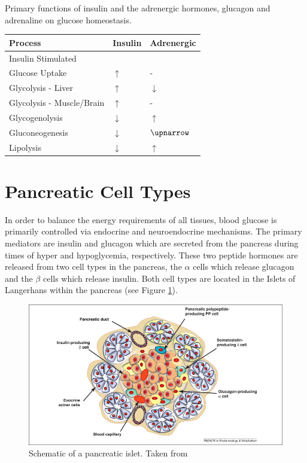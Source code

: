 \documentclass{tufte-handout}
\begin{document}
\begin{margintable}
\caption{Primary functions of insulin and the adrenergic hormones, glucagon and adrenaline on glucose homeostasis.}
\label{tab:endocrine-glucose}
\begin{tabular}{@{}lll@{}}
\textbf{Process }                          & \textbf{Insulin}  & \textbf{Adrenergic}           \\ \midrule
Insulin Stimulated \\Glucose Uptake & $\uparrow$ & -  \\ \midrule
Glycolysis - Liver & $\uparrow$ & $\downarrow$ \\  \midrule
Glycolysis - Muscle/Brain & $\uparrow$ & - \\  \midrule
Glycogenolysis & $\downarrow$ & $\uparrow$ \\ \midrule
Gluconeogenesis & $\downarrow$ & $\upnarrow$\\ \midrule
Lipolysis & $\downarrow$ & $\uparrow$ \\ \bottomrule

\end{tabular}
\end{margintable}

\section{Pancreatic Cell Types}

In order to balance the energy requirements of all tissues, blood glucose is primarily controlled via endocrine and neuroendocrine mechanisms.  The primary mediators are insulin and glucagon which are secreted from the pancreas during times of hyper and hypoglycemia, respectively.  These two peptide hormones are released from two cell types in the pancreas, the $\alpha$ cells which release glucagon and the $\beta$ cells which release insulin.  Both cell types are located in the Islets of Langerhans within the pancreas (see Figure \ref{pancreas-cells}).

\begin{figure}
\includegraphics{figures/insulin-cells.png}
\caption{Schematic of a pancreatic islet.  Taken from \citet{Efrat2012}}
\label{pancreas-cells}
\end{figure}
\end{document}
